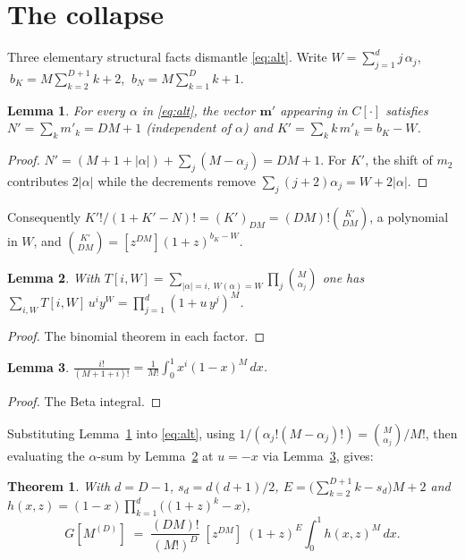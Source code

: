 \documentclass[11pt]{article}
\newtheorem{theorem}{Theorem}\newtheorem{lemma}{Lemma}
\newcommand{\ff}[2]{(#1)_{#2}}
\begin{document}
\section{The collapse}
Three elementary structural facts dismantle \eqref{eq:alt}. Write
$W=\sum_{j=1}^{d}j\,\alpha_j$, $\ b_K=M\sum_{k=2}^{D+1}k+2$, $\ b_N=M\sum_{k=1}^{D}k+1$.
\begin{lemma}\label{lem:const}
For every $\alpha$ in \eqref{eq:alt}, the vector $\mathbf m'$ appearing in $C[\cdot]$ satisfies
$N'=\sum_k m'_k=DM+1$ (independent of $\alpha$) and $K'=\sum_k k\,m'_k=b_K-W$.
\end{lemma}
\begin{proof}
$N'=(M{+}1{+}|\alpha|)+\sum_j(M-\alpha_j)=DM+1$. For $K'$, the shift of $m_2$ contributes
$2|\alpha|$ while the decrements remove $\sum_j (j{+}2)\alpha_j=W+2|\alpha|$.
\end{proof}
Consequently $K'!/(1+K'-N)!=\ff{K'}{DM}=(DM)!\binom{K'}{DM}$, a polynomial in $W$, and
$\binom{K'}{DM}=[z^{DM}](1+z)^{b_K-W}$.
\begin{lemma}\label{lem:prod}
With $T[i,W]=\sum_{|\alpha|=i,\ W(\alpha)=W}\prod_j\binom{M}{\alpha_j}$ one has
$\sum_{i,W}T[i,W]\,u^i y^W=\prod_{j=1}^{d}(1+u\,y^{j})^{M}$.
\end{lemma}
\begin{proof} The binomial theorem in each factor. \end{proof}
\begin{lemma}\label{lem:beta}
$\displaystyle \frac{i!}{(M{+}1{+}i)!}=\frac{1}{M!}\int_0^1 x^{i}(1-x)^{M}\,dx$.
\end{lemma}
\begin{proof} The Beta integral. \end{proof}
Substituting Lemma~\ref{lem:const} into \eqref{eq:alt}, using
$1/(\alpha_j!(M-\alpha_j)!)=\binom{M}{\alpha_j}/M!$, then evaluating the $\alpha$-sum by
Lemma~\ref{lem:prod} at $u=-x$ via Lemma~\ref{lem:beta}, gives:
\begin{theorem}\label{thm:main}
With $d=D-1$, $s_d=d(d+1)/2$, $E=\bigl(\sum_{k=2}^{D+1}k-s_d\bigr)M+2$ and
$h(x,z)=(1-x)\prod_{k=1}^{d}\bigl((1+z)^k-x\bigr)$,
\[ G[M^{(D)}]\;=\;\frac{(DM)!}{(M!)^{D}}\;[z^{DM}]\;(1+z)^{E}\int_0^1 h(x,z)^{M}\,dx. \]
\end{theorem}
\end{document}

